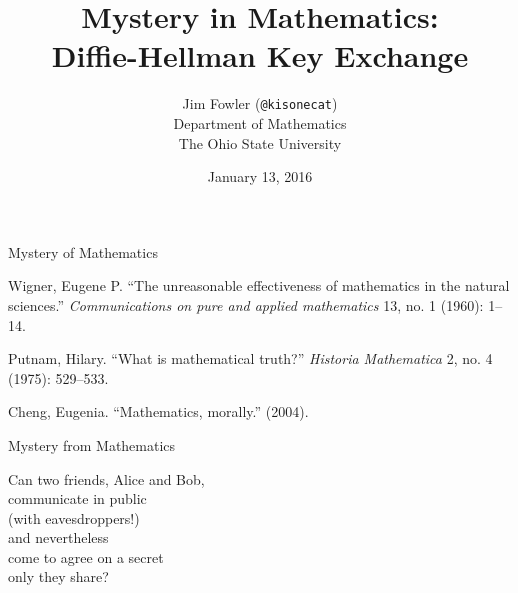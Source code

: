 \documentclass[14pt,aspectratio=169]{beamer}
\author{Jim Fowler (\texttt{@kisonecat})\\ Department of Mathematics \\ The Ohio State University}
\date{January 13, 2016}
\title{Mystery in Mathematics: \\ Diffie-Hellman Key Exchange}
\begin{document}
\begin{frame}
\maketitle
\end{frame}

\begin{frame}
  \Huge

  \begin{center}
    Mystery of Mathematics
  \end{center}
\end{frame}

\begin{frame}
\hangindent=0.7cm Wigner, Eugene P. ``The unreasonable effectiveness of mathematics in the natural sciences.'' \textit{Communications on pure and applied mathematics} 13, no. 1 (1960): 1--14.

\vfill

\hangindent=0.7cm Putnam, Hilary. ``What is mathematical truth?'' \textit{Historia Mathematica} 2, no. 4 (1975): 529--533.

\vfill

\hangindent=0.7cm Cheng, Eugenia. ``Mathematics, morally.'' (2004).
\end{frame}

\begin{frame}
  \Huge

  \begin{center}
    Mystery from Mathematics
  \end{center}
\end{frame}


\begin{frame}
  \huge

  Can two friends, Alice and Bob, \\
  \quad communicate in public \\
  \quad \quad (with eavesdroppers!) \\
  and nevertheless \\
  \quad come to agree on a secret \\
  \quad only they share?
\end{frame}

\newcommand{\swatch}[1]{\textcolor{#1}{\rule{12pt}{12pt}}}

\newcommand{\aliceroombob}[3]{%
  \begin{tabular}{@{}p{0.33\textwidth}@{}p{0.33\textwidth}@{}p{0.33\textwidth}@{}}
    \begin{center}#1\end{center} & \begin{center}#2\end{center} & \begin{center}#3\end{center} 
  \end{tabular}\\[-6ex]}
\end{document}
